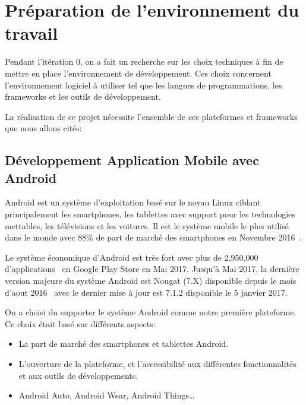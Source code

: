 \section{Préparation de l'environnement du travail}

Pendant l'itération 0, on a fait un recherche sur les choix techniques à fin de
mettre en place l'environnement de développement. Ces choix concernent
l'environnement logiciel à utiliser tel que les langues de programmations, les
frameworks et les outils de développement.


La réalisation de ce projet nécessite l'ensemble de ces plateformes et
frameworks que nous allons cités:

\subsection{Développement Application Mobile avec Android}

Android est un système d'exploitation basé sur le noyau Linux ciblant
principalement les smartphones, les tablettes avec support pour les
technologies mettables, les télévisions et les voitures. Il est le système
mobile le plus utilisé dans le monde avec 88\% de part de marché des
smartphones en Novembre 2016~\cite{android-market-share}.

Le système économique d'Android est très fort avec plus de 2,950,000
d'applications~\cite{android-apps} en Google Play Store en
Mai 2017. Jusqu'à Mai 2017, la dernière version majeure du système Android est
Nougat (7.X) disponible depuis le mois d'aout 2016~\cite{android-7-release}
avec le dernier mise à jour est 7.1.2 disponible le 5 janvier 2017.

On a choisi du supporter le système Android comme notre première plateforme. Ce
choix était basé sur différents aspects:

\begin{itemize}
    \item La part de marché des smartphones et tablettes Android.
    \item L'ouverture de la plateforme, et l'accessibilité aux différentes
        fonctionnalités et aux outils de développements.
    \item Android Auto, Android Wear, Android Things\ldots
\end{itemize}

